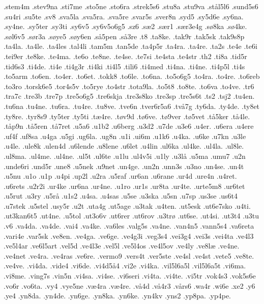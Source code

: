 .stem4m
.stev9na
.sti7me
.sto5ne
.sto6ra
.strek5s6
.stu8a
.stu9va
.st^^e5l5l6
.sund5s6
.su4ri
.su5te
.sv8
.sva5la
.sva5ra.
.sva5re
.svar5s
.sver8n
.syd5 
.sy5d6e
.sy6na.
.sy4ne.
.sy5ter
.sy3ti
.sy6v5
.sy6v5o6g5
.sz6
.s^^e62
.s^^e6r1
.s^^e6r3e4g
.s^^f88ka
.s^^f84ke.
.s^^f8l6v5
.s^^f8r3a
.s^^f8ye5
.s^^f8y6en
.s^^e55pen
.s^^e53re
.t8
.ta8ke.
.tak9r
.tak5sk
.tak9s8p
.ta4la.
.ta4le.
.ta4les
.tal4li
.tam5m
.tan5de
.ta4p5r
.ta4ra.
.ta4re.
.ta2s
.te4e
.te6i
.tei9er
.te8ke.
.te4ma.
.te6o
.te8ne.
.te4se.
.te7si
.te4sta
.te4str
.th2
.ti8a
.tid5r
.tid6s3
.ti4de.
.ti4e
.ti4g3r
.ti4ki
.ti4l5
.tili6
.ti4med
.ti4na.
.ti4ne.
.ti4p5l
.ti4s
.to5arm
.to6en.
.to4er.
.to6et.
.tokk8
.to6le.
.to6na.
.to5o6g5
.to4ra.
.to4re.
.to6reb
.to3ro
.torsk6e5
.tor4s5v
.to5rye
.to4str
.tota9la.
.to5t8
.to8te.
.to6va
.to4ve.
.tr6
.tra7c
.tre3b
.tre7p
.tre5o6g5
.tre6skja
.tre3s8ko
.tre3sp
.tre5s6t
.ts2
.tsj2
.tu4en.
.tu6na
.tu4ne.
.tu6ra.
.tu4re.
.tu8ve.
.tve6n
.tver6r5a6
.tv^^e57g
.ty6da.
.ty4de.
.ty8et
.ty8re.
.tyr8s9
.ty5ter
.ty5ti
.t^^e64re.
.t^^f8v9d
.t^^f86ve.
.t^^f89ver
.t^^f85vet
.t^^e55ker
.t^^e54le.
.t^^e5p9n
.t^^e55ren
.t^^e57ret
.u5a6
.u1b2
.u6berg
.u3d2
.u7de
.u3e6
.u4er.
.u6era
.u4ere
.uf4f
.uf8sa
.u4ga
.u5gi
.ug6la.
.ug8n
.u1i
.ui6m
.u1k6
.u4ka.
.u6ke
.u7kn
.u3le
.u4le.
.ule8k
.ulen4d
.u6lende
.u8lene
.u6let
.u4lin
.ul6ka
.ul4ke.
.ul4la.
.ul8le.
.ul8ma.
.ul4me.
.ul4ne.
.ul5t
.ul6te
.u1lu
.ul4v5i
.u1ly
.u3l^^e5
.u5ma
.umu7
.u2n
.unde6ri
.und5r
.une8
.u5nek
.u9net
.un4ge.
.un2n
.unn3s
.u3no
.un4se.
.un4t
.u5nu
.u1o
.u1p
.u4pi
.up2l
.u2ra
.u5raf
.ur6an
.u6rane
.ur4d
.ure4n
.u4ret.
.u6rets
.u2r2i
.ur4ke
.ur6na
.ur4ne.
.u1ro
.ur1s
.ur8ta
.ur4te.
.urte5m8
.ur6tet
.u5rut
.u3ry
.u5r^^e5
.u1s2
.u4sa.
.u4sas
.u5se
.u3ska
.u5sn
.u7sp
.us3se
.us6t4
.u7stek
.u5stel
.usy5r
.u2t
.uta4g
.ut5age
.u3tak
.u4ten.
.ut5esk
.ut6e7sko
.u4ti.
.ut3kan6t5
.ut4ne.
.u5tol
.ut3o6v
.ut6rer
.ut6rov
.u3tr^^f8
.ut6se.
.ut4si.
.ut3t4
.u3tu
.v6
.va4da.
.va4de.
.vai4
.va4ke.
.va6les
.valg5s
.va4ne.
.van4n5
.vann5s4
.va6reta
.vari4e
.var5sk
.ve8en.
.ve4ga.
.ve6ge.
.ve4g3i
.veg3s4
.vei3g4
.vei3s
.vei4ta
.ve4l3
.ve5l4ar
.ve6l5art
.vel5d
.ve4l3e
.vel5l
.ve5l4os
.ve4l5ov
.ve4ly
.ve8l^^e6
.ve4ne.
.ve4net
.ve4ra.
.ve4ras
.ve6re.
.vermo9
.vers4t
.ver5ste
.ve4sl
.ve4st
.vete5
.ve8te.
.ve4ve.
.vi4da.
.vide4
.vi6de.
.vi4d5^^e54
.vi2e
.vi4ka.
.vil5l6a5l  
.vil5l6a5t
.vi6ma.
.vi8me.
.ving7s
.vin5n
.vi4sa.
.vi4se.
.vi6seri
.vi4ta.
.vi4te.
.vi5tr
.vok4s3
.vok5s6e
.vo6r
.vo6ta.
.vy4
.vye5ne
.v^^e64ra
.v^^e64re.
.v^^e54d
.v^^e54r3
.v^^e5rs6
.wa4r
.wi6e
.xe2
.y6
.ye4
.yn8da.
.yn4de.
.yn6ge.
.yn8ka.
.yn6ke.
.yn4kv
.yns2
.yp8pa.
.yp4pe.
